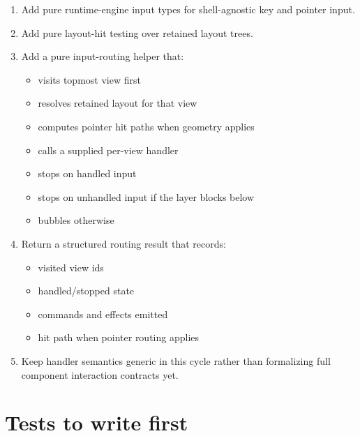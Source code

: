 \begin{enumerate}
\def\labelenumi{\arabic{enumi}.}
\tightlist
\item
  Add pure runtime-engine input types for shell-agnostic key and pointer input.
\item
  Add pure layout-hit testing over retained layout trees.
\item
  Add a pure input-routing helper that:

  \begin{itemize}
  \tightlist
  \item
    visits topmost view first
  \item
    resolves retained layout for that view
  \item
    computes pointer hit paths when geometry applies
  \item
    calls a supplied per-view handler
  \item
    stops on handled input
  \item
    stops on unhandled input if the layer blocks below
  \item
    bubbles otherwise
  \end{itemize}
\item
  Return a structured routing result that records:

  \begin{itemize}
  \tightlist
  \item
    visited view ids
  \item
    handled/stopped state
  \item
    commands and effects emitted
  \item
    hit path when pointer routing applies
  \end{itemize}
\item
  Keep handler semantics generic in this cycle rather than formalizing full component interaction contracts yet.
\end{enumerate}

\section{Tests to write first}\label{record-152-tests-to-write-first}


